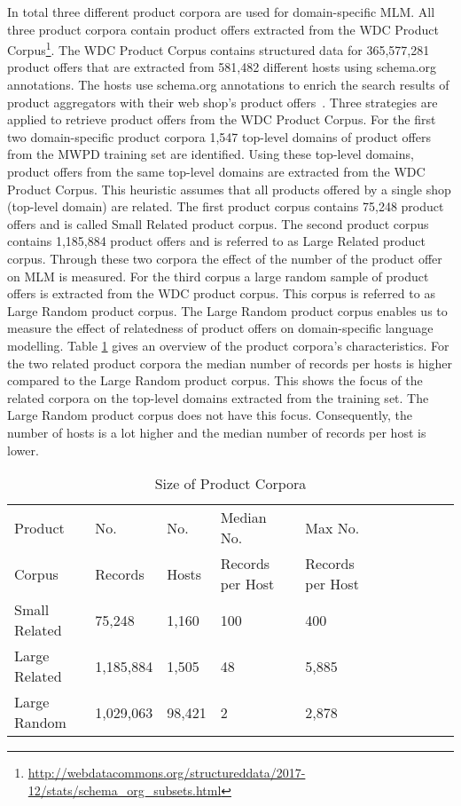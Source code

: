 \documentclass[11pt,dvipdfm]{article}
\begin{document}
In total three different product corpora are used for domain-specific \ac{MLM}.
All three product corpora contain product offers extracted from the \ac{WDC} Product Corpus\footnote{\url{http://webdatacommons.org/structureddata/2017-12/stats/schema\_org\_subsets.html}}.
The \ac{WDC} Product Corpus contains structured data for 365,577,281 product offers that are extracted from 581,482 different hosts using schema.org annotations.
The hosts use schema.org annotations to enrich the search results of product aggregators with their web shop's product offers~\cite{primpeli_wdc_2019}.
Three strategies are applied to retrieve product offers from the \ac{WDC} Product Corpus.
For the first two domain-specific product corpora 1,547 top-level domains of product offers from the \ac{MWPD} training set are identified.
Using these top-level domains, product offers from the same top-level domains are extracted from the \ac{WDC} Product Corpus.
This heuristic assumes that all products offered by a single shop (top-level domain) are related.
The first product corpus contains 75,248 product offers and is called Small Related product corpus.
The second product corpus contains 1,185,884 product offers and is referred to as Large Related product corpus.
Through these two corpora the effect of the number of the product offer on \ac{MLM} is measured.
For the third corpus a large random sample of product offers is extracted from the \ac{WDC} product corpus.
This corpus is referred to as Large Random product corpus.
The Large Random product corpus enables us to measure the effect of relatedness of product offers on domain-specific language modelling.
Table \ref{tab:DSLM1} gives an overview of the product corpora's characteristics.
For the two related product corpora the median number of records per hosts is higher compared to the Large Random product corpus.
This shows the focus of the related corpora on the top-level domains extracted from the training set.
The Large Random product corpus does not have this focus.
Consequently, the number of hosts is a lot higher and the median number of records per host is lower.
\begin{table}[h]
  \centering
\begin{tabular}{@{}llllllllll@{}}
Product      &No.      & No. & Median No.  & Max No. \\
Corpus &Records & Hosts & Records per Host & Records per Host \\ \hline
Small Related & 75,248    & 1,160              & 100                      & 400 \\
Large Related & 1,185,884 & 1,505              & 48                     & 5,885 \\
Large Random& 1,029,063 & 98,421             & 2                  & 2,878 \\ \hline
\end{tabular}
\caption{Size of Product Corpora}
\label{tab:DSLM1}
\end{table}
\end{document}
